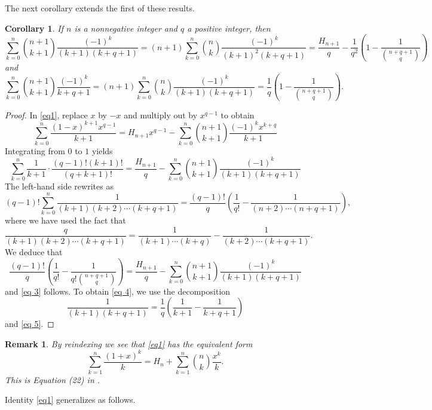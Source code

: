 \documentclass[10pt,a4paper]{amsart}
\numberwithin{equation}{section}
\newtheorem{corollary}[thm]{Corollary}
\newtheorem{remark}[thm]{Remark}
\begin{document}
The next corollary extends the first of these results.

\begin{corollary}
If $n$ is a nonnegative integer and $q$ a positive integer, then
\begin{equation}\label{eq 3}
\sum_{k=0}^n \binom{n+1}{k+1} \frac{(-1)^k}{(k+1)(k+q+1)} =(n+1)\sum_{k=0}^n \binom{n}{k} \frac{(-1)^k}{(k+1)^2(k+q+1)} = \frac{H_{n+1}}{q}-\frac{1}{q^2}\left(1-\frac{1}{\binom{n+q+1}{q}}\right)
\end{equation}
and
\begin{equation}\label{eq 4}
\sum_{k=0}^n \binom{n+1}{k+1} \frac{(-1)^k}{k+q+1} = (n+1)\sum_{k=0}^n \binom{n}{k} \frac{(-1)^k}{(k+1)(k+q+1)} 
= \frac{1}{q}\left(1-\frac{1}{\binom{n+q+1}{q}}\right).
\end{equation}
\end{corollary}
\begin{proof}
In \eqref{eq1}, replace $x$ by $-x$ and multiply out by $x^{q-1}$ to obtain
\[\sum_{k=0}^n\frac{(1-x)^{k+1}x^{q-1}}{k+1}=H_{n+1}x^{q-1}-\sum_{k=0}^n\binom{n+1}{k+1}\frac{(-1)^k x^{k+q}}{k+1}\]
Integrating from $0$ to $1$ yields
\[\sum_{k=0}^n\frac{1}{k+1}\cdot\frac{(q-1)!(k+1)!}{(q+k+1)!}=\frac{H_{n+1}}{q}- \sum_{k=0}^n\binom{n+1}{k+1}\frac{(-1)^k }{(k+1)(k+q+1)}\]
The left-hand side rewrites as 
\[(q-1)!\sum_{k=0}^n \frac{1}{(k+1)(k+2)\cdots (k+q+1)}=\frac{(q-1)!}{q}\left(\frac{1}{ q!}-\frac{1}{(n+2)\cdots (n+q+1)}\right),\]
where we have used the fact that
\[\frac{q}{(k+1)(k+2)\cdots (k+q+1)}=\frac{1}{(k+1)\cdots (k+q)}-\frac{1}{(k+2)\cdots (k+q+1)}.\]
We deduce that
\[\frac{(q-1)!}{q}\left(\frac{1}{ q!}-\frac{1}{q!\binom{n+q+1}{q}}\right)=\frac{H_{n+1}}{q}- \sum_{k=0}^n\binom{n+1}{k+1}\frac{(-1)^k }{(k+1)(k+q+1)}\]
and \eqref{eq 3} follows. To obtain \eqref{eq 4}, we use the decomposition 
\[\frac{1}{(k+1)(k+q+1)}=\frac{1}{q}\left(\frac{1}{k+1}-\frac{1}{k+q+1}\right)\]
and \eqref{eq 5}.
\end{proof}

\begin{remark}
By reindexing we see that \eqref{eq1} has the equivalent form
\begin{equation*}
\sum_{k=1}^n \frac{(1+x)^k}{k} = H_n + \sum_{k=1}^n \binom{n}{k} \frac{x^k}{k}.
\end{equation*}
This is Equation (22) in \cite{Adegoke}. 
\end{remark}

Identity \eqref{eq1} generalizes as follows.
\end{document}
